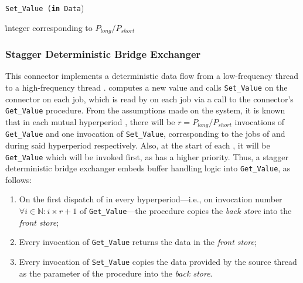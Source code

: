 \begin{algorithm}
\caption{\texttt{Set\_Value (\textbf{in} Data})}
\label{algo:stepper_write}
\r{integer corresponding to $P_{long}/P_{short}$}
\SetLine
{}
\end{algorithm}

\subsubsection{Stagger Deterministic Bridge Exchanger}
This connector implements a deterministic data flow from a
low-frequency thread \tl to a high-frequency thread \ts. \tl computes
a new value and calls \texttt{Set\_Value} on the connector on each
job, which is read by \ts on each job via a call to the connector's
\texttt{Get\_Value} procedure. From the assumptions made on the
system, it is known that in each mutual hyperperiod \plong, there will
be $r=P_{long}/P_{short}$ invocations of \texttt{Get\_Value} and one
invocation of \texttt{Set\_Value}, corresponding to the jobs of \tl
and \ts during said hyperperiod respectively. Also, at the start of
each \plong, it will be \texttt{Get\_Value} which will be invoked
first, as \ts has a higher priority. Thus, a stagger deterministic
bridge exchanger embeds buffer handling logic into
\texttt{Get\_Value}, as follows:

\begin{enumerate}
\item{On the first dispatch of \ts in every hyperperiod---i.e., on
  invocation number $\forall i\in\mathbb{N}:i\times r+1$ of
  \texttt{Get\_Value}---the procedure copies the \emph{back store} into the
  \emph{front store};}
\item{Every invocation of \texttt{Get\_Value} returns the data in the
  \emph{front store};}
\item{Every invocation of \texttt{Set\_Value} copies the data provided
  by the source thread as the parameter of the procedure into the
  \emph{back store}.}
\end{enumerate}

